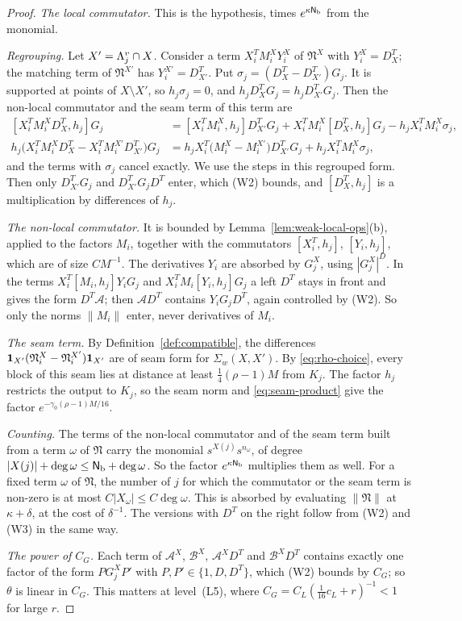 \begin{proof}
\emph{The local commutator.} This is the hypothesis, times $e^{\kappa\mathsf N_{\rm b}}$ from the monomial.

\emph{Regrouping.} Let $X'=\Lambda^v_j\cap X$. Consider a term $X_i^TM^X_iY^X_i$ of $\mathfrak N^X$ with $Y^X_i=D^T_X$; the matching term of $\mathfrak N^{X'}$ has $Y^{X'}_i=D^T_{X'}$. Put $\sigma_j=(D^T_X-D^T_{X'})G_j$. It is supported at points of $X\setminus X'$, so $h_j\sigma_j=0$, and $h_jD^T_XG_j=h_jD^T_{X'}G_j$. Then the non-local commutator and the seam term of this term are
\[
\begin{aligned}
{}[X_i^TM^X_iD^T_X,h_j]G_j&=[X_i^TM^X_i,h_j]D^T_{X'}G_j+X_i^TM^X_i[D^T_X,h_j]G_j-h_jX_i^TM^X_i\sigma_j,\\
h_j\big(X_i^TM^X_iD^T_X-X_i^TM^{X'}_iD^T_{X'}\big)G_j&=h_jX_i^T\big(M^X_i-M^{X'}_i\big)D^T_{X'}G_j+h_jX_i^TM^X_i\sigma_j ,
\end{aligned}
\]
and the terms with $\sigma_j$ cancel exactly. We use the steps in this regrouped form. Then only $D^T_{X'}G_j$ and $D^T_{X'}G_jD^T$ enter, which (W2) bounds, and $[D^T_X,h_j]$ is a multiplication by differences of $h_j$.

\emph{The non-local commutator.} It is bounded by Lemma~\ref{lem:weak-local-ops}(b), applied to the factors $M_i$, together with the commutators $[X_i^T,h_j]$, $[Y_i,h_j]$, which are of size $CM^{-1}$. The derivatives $Y_i$ are absorbed by $G^X_j$, using $|G^X_j|^D$. In the terms $X_i^T[M_i,h_j]Y_iG_j$ and $X_i^TM_i[Y_i,h_j]G_j$ a left $D^T$ stays in front and gives the form $D^T\mathcal A$; then $\mathcal AD^T$ contains $Y_iG_jD^T$, again controlled by (W2). So only the norms $\|M_i\|$ enter, never derivatives of $M_i$.

\emph{The seam term.} By Definition~\ref{def:compatible}, the differences $\mathbf 1_{X'}(\mathfrak N^X_i-\mathfrak N^{X'}_i)\mathbf 1_{X'}$ are of seam form for $\Sigma_w(X,X')$. By \eqref{eq:rho-choice}, every block of this seam lies at distance at least $\frac14(\rho-1)M$ from $K_j$. The factor $h_j$ restricts the output to $K_j$, so the seam norm and \eqref{eq:seam-product} give the factor $e^{-\gamma_0(\rho-1)M/16}$.

\emph{Counting.} The terms of the non-local commutator and of the seam term built from a term $\omega$ of $\mathfrak N$ carry the monomial $s^{X(j)}s^{n_\omega}$, of degree $|X(j)|+\deg\omega\le\mathsf N_{\rm b}+\deg\omega$. So the factor $e^{\kappa\mathsf N_{\rm b}}$ multiplies them as well. For a fixed term $\omega$ of $\mathfrak N$, the number of $j$ for which the commutator or the seam term is non-zero is at most $C|X_\omega|\le C\deg\omega$. This is absorbed by evaluating $\|\mathfrak N\|$ at $\kappa+\delta$, at the cost of $\delta^{-1}$. The versions with $D^T$ on the right follow from (W2) and (W3) in the same way.

\emph{The power of $C_G$.} Each term of $\mathcal A^X$, $\mathcal B^X$, $\mathcal A^XD^T$ and $\mathcal B^XD^T$ contains exactly one factor of the form $PG^X_jP'$ with $P,P'\in\{1,D,D^T\}$, which (W2) bounds by $C_G$; so $\theta$ is linear in $C_G$. This matters at level~(L5), where $C_G=C_L(\frac1{16}c_L+r)^{-1}<1$ for large $r$.
\end{proof}

